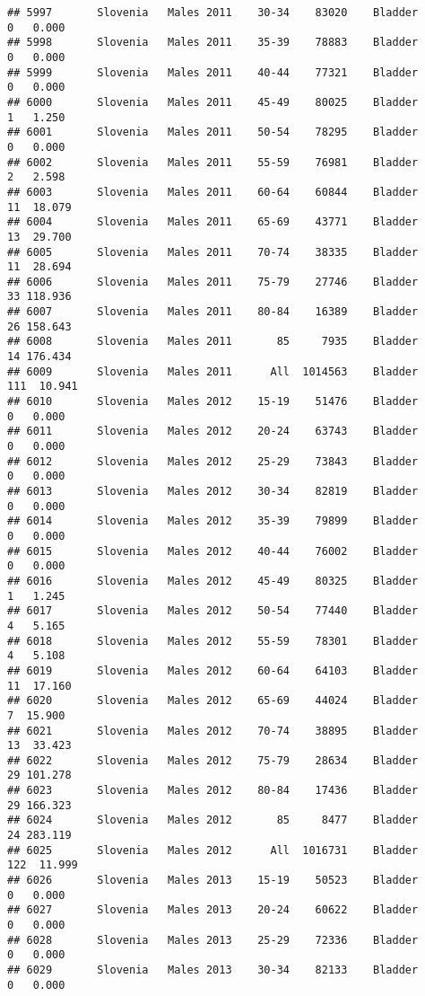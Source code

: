 \documentclass[
]{article}
\begin{document}
\begin{verbatim}
## 5997       Slovenia   Males 2011    30-34    83020    Bladder      0   0.000
## 5998       Slovenia   Males 2011    35-39    78883    Bladder      0   0.000
## 5999       Slovenia   Males 2011    40-44    77321    Bladder      0   0.000
## 6000       Slovenia   Males 2011    45-49    80025    Bladder      1   1.250
## 6001       Slovenia   Males 2011    50-54    78295    Bladder      0   0.000
## 6002       Slovenia   Males 2011    55-59    76981    Bladder      2   2.598
## 6003       Slovenia   Males 2011    60-64    60844    Bladder     11  18.079
## 6004       Slovenia   Males 2011    65-69    43771    Bladder     13  29.700
## 6005       Slovenia   Males 2011    70-74    38335    Bladder     11  28.694
## 6006       Slovenia   Males 2011    75-79    27746    Bladder     33 118.936
## 6007       Slovenia   Males 2011    80-84    16389    Bladder     26 158.643
## 6008       Slovenia   Males 2011       85     7935    Bladder     14 176.434
## 6009       Slovenia   Males 2011      All  1014563    Bladder    111  10.941
## 6010       Slovenia   Males 2012    15-19    51476    Bladder      0   0.000
## 6011       Slovenia   Males 2012    20-24    63743    Bladder      0   0.000
## 6012       Slovenia   Males 2012    25-29    73843    Bladder      0   0.000
## 6013       Slovenia   Males 2012    30-34    82819    Bladder      0   0.000
## 6014       Slovenia   Males 2012    35-39    79899    Bladder      0   0.000
## 6015       Slovenia   Males 2012    40-44    76002    Bladder      0   0.000
## 6016       Slovenia   Males 2012    45-49    80325    Bladder      1   1.245
## 6017       Slovenia   Males 2012    50-54    77440    Bladder      4   5.165
## 6018       Slovenia   Males 2012    55-59    78301    Bladder      4   5.108
## 6019       Slovenia   Males 2012    60-64    64103    Bladder     11  17.160
## 6020       Slovenia   Males 2012    65-69    44024    Bladder      7  15.900
## 6021       Slovenia   Males 2012    70-74    38895    Bladder     13  33.423
## 6022       Slovenia   Males 2012    75-79    28634    Bladder     29 101.278
## 6023       Slovenia   Males 2012    80-84    17436    Bladder     29 166.323
## 6024       Slovenia   Males 2012       85     8477    Bladder     24 283.119
## 6025       Slovenia   Males 2012      All  1016731    Bladder    122  11.999
## 6026       Slovenia   Males 2013    15-19    50523    Bladder      0   0.000
## 6027       Slovenia   Males 2013    20-24    60622    Bladder      0   0.000
## 6028       Slovenia   Males 2013    25-29    72336    Bladder      0   0.000
## 6029       Slovenia   Males 2013    30-34    82133    Bladder      0   0.000

\end{verbatim}
\end{document}
